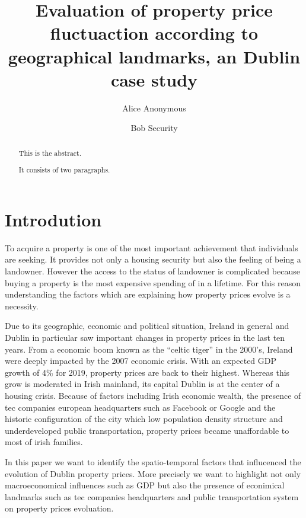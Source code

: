 \documentclass[]{elsarticle} %
\begin{document}
\begin{frontmatter}

  \title{Evaluation of property price fluctuaction according to geographical
landmarks, an Dublin case study}
    \author[Some Institute of Technology]{Alice Anonymous}
    \author[Another University]{Bob Security}
  
      \address[Some Institute of Technology]{Department, Street, City, State, Zip}
    \address[Another University]{Department, Street, City, State, Zip}
  
  \begin{abstract}
  This is the abstract.
  
  It consists of two paragraphs.
  \end{abstract}
  
 \end{frontmatter}

\section{Introdution}\label{introdution}

To acquire a property is one of the most important achievement that
individuals are seeking. It provides not only a housing security but
also the feeling of being a landowner. However the access to the status
of landowner is complicated because buying a property is the most
expensive spending of in a lifetime. For this reason understanding the
factors which are explaining how property prices evolve is a necessity.

Due to its geographic, economic and political situation, Ireland in
general and Dublin in particular saw important changes in property
prices in the last ten years. From a economic boom known as the ``celtic
tiger'' in the 2000's, Ireland were deeply impacted by the 2007 economic
crisis. With an expected GDP growth of 4\% for 2019, property prices are
back to their highest. Whereas this grow is moderated in Irish mainland,
its capital Dublin is at the center of a housing crisis. Because of
factors including Irish economic wealth, the presence of tec companies
european headquarters such as Facebook or Google and the historic
configuration of the city which low population density structure and
underdeveloped public transportation, property prices became
unaffordable to most of irish families.

In this paper we want to identify the spatio-temporal factors that
influcenced the evolution of Dublin property prices. More precisely we
want to highlight not only macroeconomical influences such as GDP but
also the presence of econimical landmarks such as tec companies
headquarters and public transportation system on property prices
evoluation.
\end{document}
